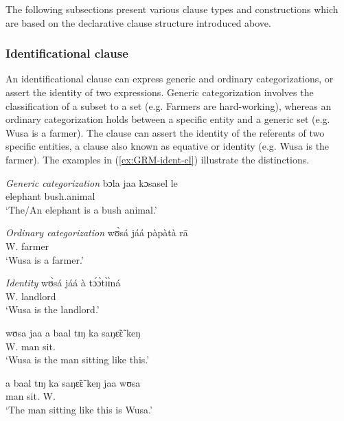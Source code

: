 The following subsections present various clause types and
constructions which are based on the declarative clause structure introduced
above.  






\subsubsection{Identificational clause}
\label{sec:GRM-ident-cl}


An identificational clause can express generic and ordinary categorizations, or
assert the identity  of two expressions. Generic categorization involves the 
classification of a subset to a set (e.g. Farmers are hard-working),
whereas an ordinary categorization holds between a specific entity and a generic
set  (e.g.  Wusa is a farmer). The clause can assert the identity of the
referents of two specific entities, a clause also known as equative or identity
(e.g. Wusa is the farmer). The examples in
(\ref{ex:GRM-ident-cl}) illustrate the
distinctions. 


\begin{exe}
\ex\label{ex:GRM-ident-cl}
\begin{xlist}


\ex\label{ex:GRM-ident-gen-cat}{\it Generic categorization}
\gll
 bɔla jaa kɔsasel le\\
 elephant {\ident}  bush.animal {\foc}\\
\glt `The/An elephant is a bush animal.'

\ex\label{ex:GRM-ident-ord-cat}{\it Ordinary categorization}
\gll
wʊ̀sá jáá pàpàtà rā\\
W. {\ident} farmer {\foc}\\
\glt `Wusa is a farmer.'

\ex\label{ex:GRM-ident-tk-id}{\it Identity}
\gll
wʊ̀sá jáá à tɔ́ɔ̀tɪ̀ɪ̀ná\\
W. {\ident} {\art} landlord\\
\glt `Wusa is the landlord.'

\gll
wʊsa jaa a baal tɪŋ ka saŋɛ̃ɛ̃ keŋ \\
W. {\ident} {\art} man {\art} {\egr} sit.{\pfv} {\advm}\\
\glt `Wusa is the man sitting like this.'

\gll
a baal tɪŋ ka saŋɛ̃ɛ̃ keŋ  jaa wʊsa  \\
 {\art} man {\art} {\egr} sit.{\pfv} {\advm} {\ident}   W. \\
\glt `The man sitting like this is Wusa.'



\end{xlist}
\end{exe}


